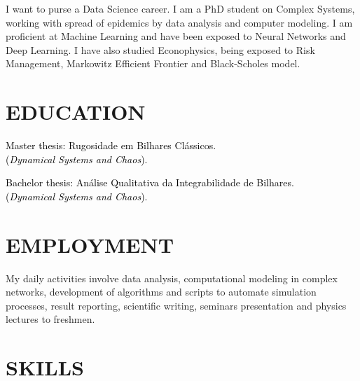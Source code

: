 \documentclass[12pt,a4paper,roman]{moderncv}        %
\begin{document}
\makecvtitle

\small{I want to purse a Data Science career. I am a PhD student on Complex Systems, working with spread of epidemics by data analysis and computer modeling. I am proficient at Machine Learning and have been exposed to Neural Networks and Deep Learning. I have also studied Econophysics, being exposed to Risk Management, Markowitz Efficient Frontier and Black-Scholes model.}

\section{EDUCATION}

\vspace{6pt}


\vspace{6pt}

\textcolor{black}{Master thesis: Rugosidade em Bilhares Clássicos.\\(\textit{Dynamical Systems and Chaos}).}

\vspace{6pt}

\textcolor{black}{Bachelor thesis: Análise Qualitativa da Integrabilidade de Bilhares.\\(\textit{Dynamical Systems and Chaos}). }

\section{EMPLOYMENT}
My daily activities involve data analysis, computational modeling in complex networks, development of algorithms and scripts to automate simulation processes, result reporting, scientific writing, seminars presentation and physics lectures to freshmen.
\section{SKILLS}
\end{document}
